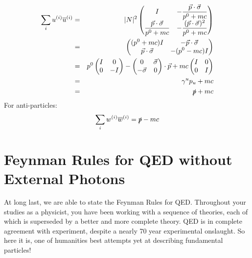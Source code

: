 \documentclass[12pt]{book}
\begin{document}
\begin{eqnarray*}
\sum_i u^{(i)} \overline{u}^{(i)}  &=& |N|^2 
\begin{pmatrix} 
\displaystyle I & -\displaystyle \frac{\vec{p}\cdot \vec{\sigma}}{p^0+mc} \\
\displaystyle \frac{\vec{p}\cdot\vec{\sigma}}{p^0+mc} &
-\displaystyle \frac{(\vec{p}\cdot\vec{\sigma})^2}{p^0+mc}\\ 
\end{pmatrix}\\
&=&
\begin{pmatrix} 
\displaystyle (p^0+mc) I & \displaystyle -\vec{p}\cdot \vec{\sigma} \\
\displaystyle \vec{p}\cdot\vec{\sigma} &
\displaystyle -(p^0-mc) I\\ 
\end{pmatrix}\\
&=& p^0 \begin{pmatrix} I & 0 \\ 0 & -I \end{pmatrix} 
- \begin{pmatrix} 0 & \vec{\sigma} \\ -\vec{\sigma} & 0 \end{pmatrix} \cdot \vec{p} 
+ mc \begin{pmatrix} I & 0 \\ 0 & I \end{pmatrix} \\
&=& \gamma^u p_u + mc \\
&=& \slashed{p} + mc \\
\end{eqnarray*}
For anti-particles:
$$\sum_i w^{(i)} \overline{w}^{(i)} = \slashed{p} - mc$$

\section{Feynman Rules for QED without External Photons}

At long last, we are able to state the Feynman Rules for QED.  Throughout your studies as a physicist, you have been working with a sequence of theories, each of which is superseded by a better and more complete theory.  QED is in complete agreement with experiment, despite a nearly 70 year experimental onslaught.  So here it is, one of humanities best attempts yet at describing fundamental particles!
\end{document}
